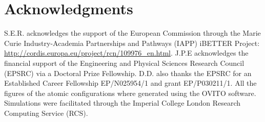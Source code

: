 \documentclass[aps,prb,reprint,superscriptaddress, a4paper]{revtex4-1}
\begin{document}
\section*{Acknowledgments}

S.E.R. acknowledges the support of the European Commission through the Marie Curie Industry-Academia Partnerships and Pathways (IAPP) iBETTER Project: \url{http://cordis.europa.eu/project/rcn/109976_en.html}. J.P.E acknowledges the financial support of the Engineering and Physical Sciences Research Council (EPSRC) via a Doctoral Prize Fellowship. D.D. also thanks the EPSRC for an Established Career Fellowship EP/N025954/1 and grant EP/P030211/1. All the figures of the atomic configurations where generated using the OVITO\cite{Stukowski2010b} software. Simulations were facilitated through the Imperial College London Research Computing Service (RCS).


\begin{figure}
    	\begin{center}
		\caption{}
		\label{fig:All_M_Profiles}
	\end{center}
\end{figure}
\end{document}
